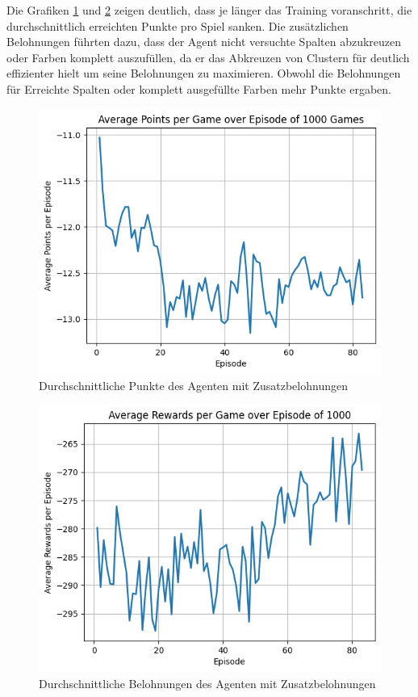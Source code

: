 Die  Grafiken \ref{fig:average_points} und \ref{fig:average_rewards} zeigen deutlich, dass je länger das Training voranschritt, die durchschnittlich erreichten Punkte pro Spiel sanken.
Die zusätzlichen Belohnungen führten dazu, dass der Agent nicht versuchte Spalten abzukreuzen oder Farben komplett auszufüllen, da er das Abkreuzen von Clustern für deutlich effizienter hielt um seine Belohnungen zu maximieren.
Obwohl die Belohnungen für Erreichte Spalten oder komplett ausgefüllte Farben mehr Punkte ergaben. 

\begin{figure}[!h]
    \centering
    \includegraphics[scale=0.6]{Bilder/average_points.png}
    \caption{Durchschnittliche Punkte des Agenten mit Zusatzbelohnungen}
    \label{fig:average_points}
\end{figure}

\begin{figure}[!h]
    \centering
    \includegraphics[scale=0.6]{Bilder/average_rewards.png}
    \caption{Durchschnittliche Belohnungen des Agenten mit Zusatzbelohnungen }
    \label{fig:average_rewards}
\end{figure}


